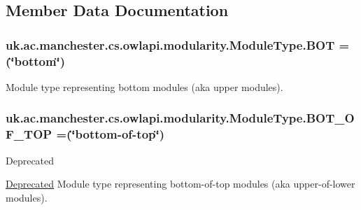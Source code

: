 \subsection{Member Data Documentation}
\hypertarget{enumuk_1_1ac_1_1manchester_1_1cs_1_1owlapi_1_1modularity_1_1_module_type_a516b9a7a0b441fe1fe20bf19d4005f87}{
\subsubsection[{B\-O\-T}]{\setlength{\rightskip}{0pt plus 5cm}uk.\-ac.\-manchester.\-cs.\-owlapi.\-modularity.\-Module\-Type.\-B\-O\-T =(\char`\"{}bottom\char`\"{})}}\label{enumuk_1_1ac_1_1manchester_1_1cs_1_1owlapi_1_1modularity_1_1_module_type_a516b9a7a0b441fe1fe20bf19d4005f87}
Module type representing bottom modules (aka upper modules). \hypertarget{enumuk_1_1ac_1_1manchester_1_1cs_1_1owlapi_1_1modularity_1_1_module_type_a9be23c39a70d72b63b886120ee1ad2cb}{
\subsubsection[{B\-O\-T\-\_\-\-O\-F\-\_\-\-T\-O\-P}]{\setlength{\rightskip}{0pt plus 5cm}uk.\-ac.\-manchester.\-cs.\-owlapi.\-modularity.\-Module\-Type.\-B\-O\-T\-\_\-\-O\-F\-\_\-\-T\-O\-P =(\char`\"{}bottom-\/of-\/top\char`\"{})}}\label{enumuk_1_1ac_1_1manchester_1_1cs_1_1owlapi_1_1modularity_1_1_module_type_a9be23c39a70d72b63b886120ee1ad2cb}
\begin{DoxyRefDesc}{Deprecated}
\item[\hyperlink{deprecated__deprecated000048}{Deprecated}]Module type representing bottom-\/of-\/top modules (aka upper-\/of-\/lower modules). \end{DoxyRefDesc}
